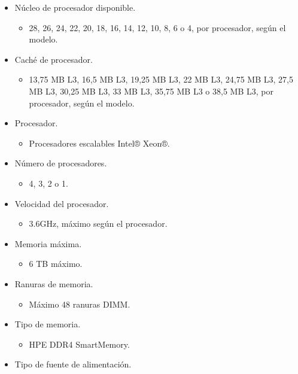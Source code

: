 \documentclass[12pt,letterpaper]{article}
\begin{document}
\begin{itemize} 
    \item Núcleo de procesador disponible.
         \begin{itemize} 
            \item 28, 26, 24, 22, 20, 18, 16, 14, 12, 10, 8, 6 o 4, por procesador, según 
            el modelo.
         \end{itemize}
    \item Caché de procesador.
        \begin{itemize}
            \item 13,75 MB L3, 16,5 MB L3, 19,25 MB L3, 22 MB L3, 24,75 MB L3, 27,5 MB L3, 
            30,25 MB L3, 33 MB L3, 35,75 MB L3 o 38,5 MB L3, por procesador, según el modelo.
        \end{itemize}
    \item Procesador.
        \begin{itemize}
            \item Procesadores escalables Intel® Xeon®.
        \end{itemize}
    \item Número de procesadores.
        \begin{itemize} 
            \item 4, 3, 2 o 1.
        \end{itemize}
    \item Velocidad del procesador.
        \begin{itemize} 
            \item 3.6GHz, máximo según el procesador.
        \end{itemize}
    \item Memoria máxima.
        \begin{itemize} 
            \item 6 TB máximo.
        \end{itemize}
    \item Ranuras de memoria.
        \begin{itemize} 
            \item Máximo 48 ranuras DIMM.
        \end{itemize}
    \item Tipo de memoria.
        \begin{itemize} 
            \item HPE DDR4 SmartMemory.
        \end{itemize}
    \item Tipo de fuente de alimentación.
        \begin{itemize} 

\end{itemize}
\end{itemize}
\end{document}
